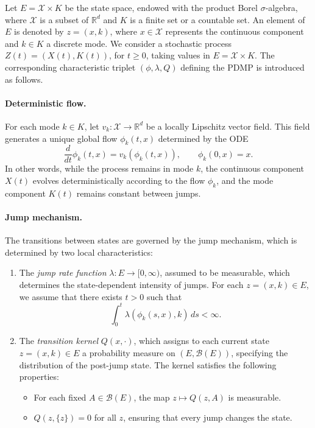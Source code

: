 \documentclass[11pt]{article}
\theoremstyle{plain}
\theoremstyle{definition}
\newcommand{\1}{\mathbf{1}}
\begin{document}
Let $E = \mathcal{X} \times K$ be the state space, endowed with the product Borel $\sigma$-algebra, where $\mathcal{X}$ is a subset of $\mathbb{R}^d$ and $K$ is a finite set or a countable set. An element of $E$ is denoted by $z = (x,k)$, where $x \in \mathcal{X}$ represents the continuous component and $k \in K$ a discrete mode. We consider a stochastic process $Z(t)=( X(t),K(t) )$, for ${t\geq 0}$, taking values in $E = \mathcal{X} \times K$. The corresponding characteristic triplet $(\phi,\lambda,Q)$ defining the PDMP is introduced as follows.


\paragraph{Deterministic flow.}

For each mode $k \in K$, let $v_k : \mathcal{X} \to \mathbb{R}^d$ be a locally Lipschitz vector field. This field generates a unique global flow $\phi_k(t,x)$ determined by the ODE
\begin{equation*}
   \frac{d}{dt}\phi_k(t,x) = v_k(\phi_k(t,x)), 
\qquad \phi_k(0,x) = x. 
\end{equation*}
In other words, while the process remains in mode $k$, the continuous component $X(t)$ evolves deterministically according to the flow $\phi_k$, and the mode component $K(t)$ remains constant between jumps.

\paragraph{Jump mechanism.}

The transitions between states are governed by the jump mechanism, which is determined by two local characteristics:
\begin{enumerate}
    \item The \emph{jump rate function} $\lambda : E \to [0,\infty)$, assumed to be measurable, which determines the state-dependent intensity of jumps. For each $z=(x,k) \in E$, we assume that there exists $t>0$ such that 
    \begin{equation*}
        \int_0^{t} \lambda(\phi_k(s,x), k) \, ds < \infty.
    \end{equation*}
    \item The \emph{transition kernel} $Q(x,\cdot)$, which assigns to each current state $z=(x,k) \in E$ a probability measure on $(E,\mathcal{B}(E))$, specifying the distribution of the post-jump state. The kernel satisfies the following properties:
    \begin{itemize}
        \item For each fixed $A \in \mathcal{B}(E)$, the map $z \mapsto Q(z,A)$ is measurable.
        \item $Q(z,\{z\})=0$ for all $z$, ensuring that every jump changes the state.
    \end{itemize}
\end{enumerate}
\end{document}
